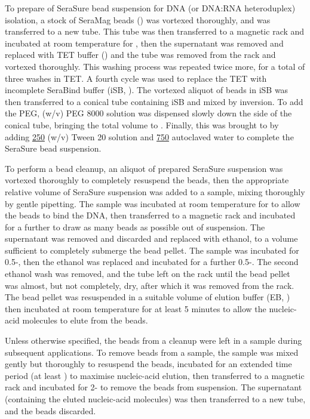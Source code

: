 To prepare  of SeraSure bead suspension for DNA (or DNA:RNA heteroduplex) isolation, a stock of SeraMag beads () was vortexed thoroughly, and  was transferred to a new tube. This tube was then transferred to a magnetic rack and incubated at room temperature for , then the supernatant was removed and replaced with  TET buffer () and the tube was removed from the rack and vortexed thoroughly. This washing process was repeated twice more, for a total of three washes in TET. A fourth cycle was used to replace the TET with incomplete SeraBind buffer (iSB, ). The vortexed  aliquot of beads in iSB was then transferred to a conical tube containing  iSB and mixed by inversion. To add the PEG,   (w/v) PEG 8000 solution was dispensed slowly down the side of the conical tube, bringing the total volume to . Finally, this was brought to  by adding \ul{250}  (w/v) Tween 20 solution and \ul{750} autoclaved water to complete the SeraSure bead suspension.

To perform a bead cleanup, an aliquot of prepared SeraSure suspension was vortexed thoroughly to completely resuspend the beads, then the appropriate relative volume of SeraSure suspension was added to a sample, mixing thoroughly by gentle pipetting. The sample was incubated at room temperature for  to allow the beads to bind the DNA, then transferred to a magnetic rack and incubated for a further  to draw as many beads as possible out of suspension. The supernatant was removed and discarded and replaced with  ethanol, to a volume sufficient to completely submerge the bead pellet. The sample was incubated for 0.5-, then the ethanol was replaced and incubated for a further 0.5-. The second ethanol wash was removed, and the tube left on the rack until the bead pellet was almost, but not completely, dry, after which it was removed from the rack. The bead pellet was resuspended in a suitable volume of elution buffer (EB, ) then incubated at room temperature for at least 5 minutes to allow the nucleic-acid molecules to elute from the beads.

Unless otherwise specified, the beads from a cleanup were left in a sample during subsequent applications. To remove beads from a sample, the sample was mixed gently but thoroughly to resuspend the beads, incubated for an extended time period (at least ) to maximise nucleic-acid elution, then transferred to a magnetic rack and incubated for 2- to remove the beads from suspension. The supernatant (containing the eluted nucleic-acid molecules) was then transferred to a new tube, and the beads discarded.

